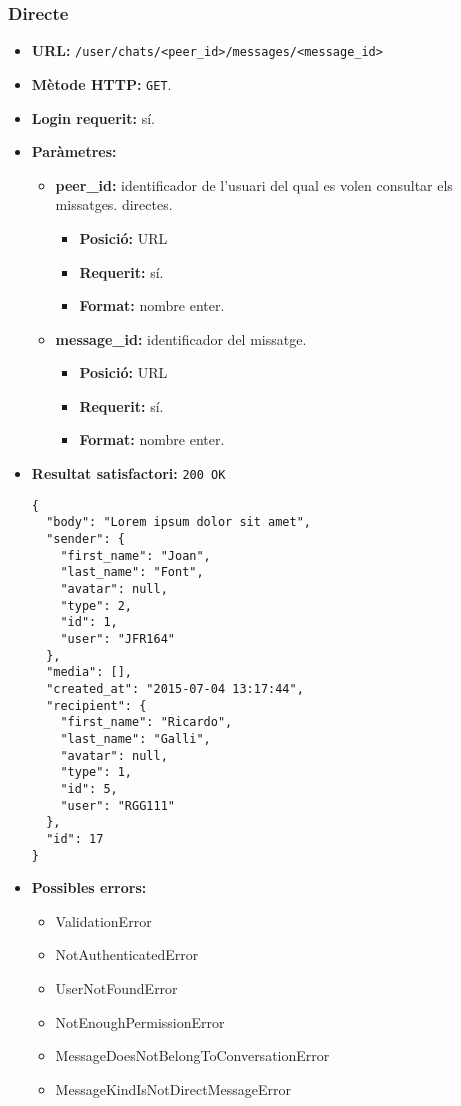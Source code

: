 	\subsubsection{Directe}
	\begin{itemize}
	\item \textbf{\ac{URL}:} \texttt{/user/chats/<peer\_id>/messages/<message\_id>}
	\item \textbf{Mètode \ac{HTTP}: } \texttt{GET}.
	\item \textbf{Login requerit:} sí.
	\item \textbf{Paràmetres:}
	\begin{itemize}
		\item \textbf{peer\_id:} identificador de l'usuari del qual es volen consultar els missatges. directes.
		\begin{itemize}
			\item \textbf{Posició:} \ac{URL}
			\item \textbf{Requerit:} sí.
			\item \textbf{Format:} nombre enter.
		\end{itemize}
		\item \textbf{message\_id:} identificador del missatge.
		\begin{itemize}
			\item \textbf{Posició:} \ac{URL}
			\item \textbf{Requerit:} sí.
			\item \textbf{Format:} nombre enter.
		\end{itemize}
	\end{itemize}
	\item \textbf{Resultat satisfactori:} \texttt{200 OK}
	\begin{verbatim}
{
  "body": "Lorem ipsum dolor sit amet",
  "sender": {
    "first_name": "Joan",
    "last_name": "Font",
    "avatar": null,
    "type": 2,
    "id": 1,
    "user": "JFR164"
  },
  "media": [],
  "created_at": "2015-07-04 13:17:44",
  "recipient": {
    "first_name": "Ricardo",
    "last_name": "Galli",
    "avatar": null,
    "type": 1,
    "id": 5,
    "user": "RGG111"
  },
  "id": 17
}
	\end{verbatim}
	\item \textbf{Possibles errors:}
	\begin{itemize}
		\item ValidationError
		\item NotAuthenticatedError
		\item UserNotFoundError
		\item NotEnoughPermissionError
		\item MessageDoesNotBelongToConversationError
		\item MessageKindIsNotDirectMessageError
	\end{itemize}
	
	\end{itemize}
	
